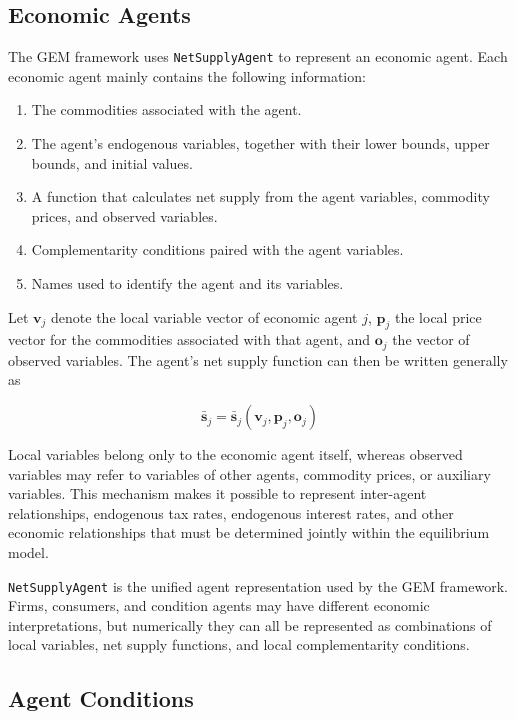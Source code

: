 \documentclass[
  letterpaper,
  DIV=11,
  numbers=noendperiod]{scrreprt}
\begin{document}
\subsection{Economic Agents}\label{economic-agents}

The GEM framework uses \texttt{NetSupplyAgent} to represent an economic
agent. Each economic agent mainly contains the following information:

\begin{enumerate}
\def\labelenumi{\arabic{enumi}.}
\item
  The commodities associated with the agent.
\item
  The agent's endogenous variables, together with their lower bounds,
  upper bounds, and initial values.
\item
  A function that calculates net supply from the agent variables,
  commodity prices, and observed variables.
\item
  Complementarity conditions paired with the agent variables.
\item
  Names used to identify the agent and its variables.
\end{enumerate}

Let \(\mathbf v_j\) denote the local variable vector of economic agent
\(j\), \(\mathbf p_j\) the local price vector for the commodities
associated with that agent, and \(\mathbf o_j\) the vector of observed
variables. The agent's net supply function can then be written generally
as

\[
\bar{\mathbf s}_j
=
\bar{\mathbf s}_j(\mathbf v_j,\mathbf p_j,\mathbf o_j)
\]

Local variables belong only to the economic agent itself, whereas
observed variables may refer to variables of other agents, commodity
prices, or auxiliary variables. This mechanism makes it possible to
represent inter-agent relationships, endogenous tax rates, endogenous
interest rates, and other economic relationships that must be determined
jointly within the equilibrium model.

\texttt{NetSupplyAgent} is the unified agent representation used by the
GEM framework. Firms, consumers, and condition agents may have different
economic interpretations, but numerically they can all be represented as
combinations of local variables, net supply functions, and local
complementarity conditions.

\subsection{Agent Conditions}\label{agent-conditions}
\end{document}
